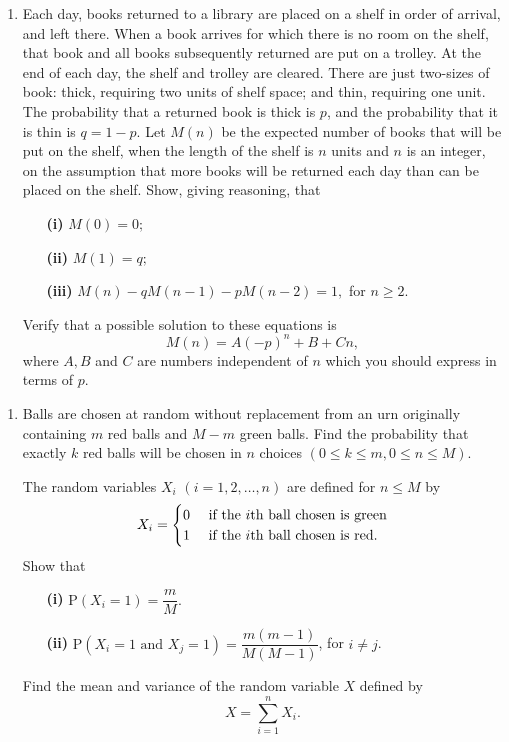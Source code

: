 \documentclass[a4, 11pt]{report}
\newlength{\qspace}
\newcounter{qnumber}
\newenvironment{question}%
 {\vspace{\qspace}
  \begin{enumerate}[\bfseries 1\quad][10]%
    \setcounter{enumi}{\value{qnumber}}%
    \item%
 }
{
  \end{enumerate}
  \filbreak
  \stepcounter{qnumber}
 }
\begin{document}
\begin{question}
Each day, books returned to a library are placed on a shelf in order
of arrival, and left there. When a book arrives for which there is
no room on the shelf, that book and all books subsequently returned
are put on a trolley. At the end of each day, the shelf and trolley
are cleared. There are just two-sizes of book: thick, requiring two
units of shelf space; and thin, requiring one unit. The probability
that a returned book is thick is $p$, and the probability that it
is thin is $q=1-p.$ Let $M(n)$ be the expected number of books that
will be put on the shelf, when the length of the shelf is $n$ units
and $n$ is an integer, on the assumption that more books will be
returned each day than can be placed on the shelf. Show, giving reasoning,
that 
\begin{itemize}
\setlength{\itemsep}{3mm}
\item[\bf (i)] $M(0)=0;$
\item[\bf (ii)] $M(1)=q;$
\item[\bf (iii)] $M(n)-qM(n-1)-pM(n-2)=1,$ for $n\geqslant2.$
\end{itemize}
Verify that a possible solution to these equations is 
\[
M(n)=A(-p)^{n}+B+Cn,
\]
where $A,B$ and $C$ are numbers independent of $n$ which you should
express in terms of $p$. 
\end{question}

\begin{question}
Balls are chosen at random without replacement from an urn originally
containing $m$ red balls and $M-m$ green balls. Find the probability
that exactly $k$ red balls will be chosen in $n$ choices $(0\leqslant k\leqslant m,0\leqslant n\leqslant M).$ 


The random variables $X_{i}$ $(i=1,2,\ldots,n)$ are defined for
$n\leqslant M$ by 
\[
X_{i}=\begin{cases}
0 & \mbox{ if the \ensuremath{i}th ball chosen is green}\\
1 & \mbox{ if the \ensuremath{i}th ball chosen is red. }
\end{cases}
\]
Show that 
\begin{itemize}
\setlength{\itemsep}{2mm}
\item[\bf (i)] $\mathrm{P}(X_{i}=1)=\dfrac{m}{M}.$
\item[\bf (ii)] $\mathrm{P}(X_{i}=1\mbox{ and }X_{j}=1)=\dfrac{m(m-1)}{M(M-1)}$,
for $i\neq j$. 
\end{itemize}

Find the mean and variance of the random variable $X$ defined by
\[
X=\sum_{i=1}^{n}X_{i}.
\]
\end{question}
\end{document}
